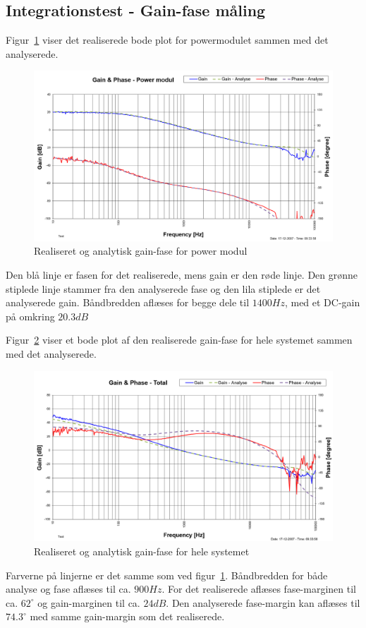 \subsection{Integrationstest - Gain-fase måling}
Figur~\ref{fig:realisering_gain_fase_power} viser det realiserede bode plot for powermodulet sammen med det analyserede.
\begin{figure}[H]
	\center
	\includegraphics[max width=0.7\linewidth]{../dokumentation/tex/2iteration/billeder/Realisering/Realisering_gain_fase_power.png}
	\caption{Realiseret og analytisk gain-fase for power modul}
	\label{fig:realisering_gain_fase_power}
\end{figure}
\noindent Den blå linje er fasen for det realiserede, mens gain er den røde linje. Den grønne stiplede linje stammer fra den analyserede fase og den lila stiplede er det analyserede gain. Båndbredden aflæses for begge dele til $1400Hz$, med et DC-gain på omkring $20.3dB$

Figur~\ref{fig:realisering_gain_fase_tot} viser et bode plot af den realiserede gain-fase for hele systemet sammen med det analyserede.
\begin{figure}[H]
	\center
	\includegraphics[max width=0.7\linewidth]{../dokumentation/tex/2iteration/billeder/Realisering/Realisering_gain_fase_tot.png}
	\caption{Realiseret og analytisk gain-fase for hele systemet}
	\label{fig:realisering_gain_fase_tot}
\end{figure}
\noindent Farverne på linjerne er det samme som ved figur~\ref{fig:realisering_gain_fase_power}. Båndbredden for både analyse og fase aflæses til ca. $900Hz$. For det realiserede aflæses fase-marginen til ca. $62^\circ$ og gain-marginen til ca. $24dB$. Den analyserede fase-margin kan aflæses til $74.3^\circ$ med samme gain-margin som det realiserede.

